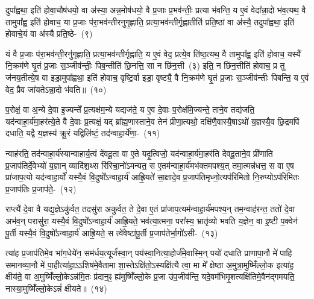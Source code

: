 दुपा᳚ह्वथा॒ इति॑ होवा॒चौष॑धयो॒ वा अ॑स्या॒ अन्न॒मोष॑धयो॒ वै प्र॒जाः प्र॒भव॑न्तीः॒ प्रत्या भ॑वन्ति॒ य ए॒वं वेदा᳚न्ना॒दो भ॑व॒त्यथ॒ वै तामुपा᳚ह्व॒ इति॑ होवाच॒ या प्र॒जाः प॑रा॒भव॑न्तीरनुगृ॒ह्णाति॒ प्रत्या॒भव॑न्तीर्गृ॒ह्णातीति॑ प्रति॒ष्ठां वा अ॑स्यै॒ तदुपा᳚ह्वथा॒ इति॑ होवाचे॒यं वा अ॑स्यै प्रति॒ष्ठे-~(९)

यं वै प्र॒जाः प॑रा॒भव॑न्ती॒रनु॑गृह्णाति॒ प्रत्या॒भव॑न्तीर्गृह्णाति॒ य ए॒वं वेद॒ प्रत्ये॒व ति॑ष्ठ॒त्यथ॒ वै तामुपा᳚ह्व॒ इति॑ होवाच॒ यस्यै॑ नि॒क्रम॑णे घृ॒तं प्र॒जाः स॒ञ्जीव॑न्तीः॒ पिब॒न्तीति॑ छि॒नत्ति॒ सा न छि॑न॒त्ती~(३) इति॒ न छि॑न॒त्तीति॑ होवाच॒ प्र तु ज॑नय॒तीत्ये॒ष वा इडा॒मुपा᳚ह्वथा॒ इति॑ होवाच॒ वृष्टि॒र्वा इडा॒ वृष्ट्यै॒ वै नि॒क्रम॑णे घृ॒तं प्र॒जाः स॒ञ्जीव॑न्तीः पिबन्ति॒ य ए॒वं वेद॒ प्रैव जा॑यते\-ऽन्ना॒दो भ॑वति॥~(१०)

{\anuvakamend[{गौर्वा अ॑स्यै॒ तत् प्र॑ति॒ष्ठा\-ऽह्व॑था॒ इति॑ विꣳश॒तिश्च॑}]}%

प॒रोक्षं॒ वा अ॒न्ये दे॒वा इ॒ज्यन्ते᳚ प्र॒त्यक्ष॑म॒न्ये यद्यज॑ते॒ य ए॒व दे॒वाः प॒रोक्ष॑मि॒ज्यन्ते॒ ताने॒व तद्य॑जति॒ यद॑न्वाहा॒र्य॑मा॒हर॑त्ये॒ते वै दे॒वाः प्र॒त्यक्षं॒ यद् ब्रा᳚ह्म॒णास्ताने॒व तेन॑ प्रीणा॒त्यथो॒ दक्षि॑णै॒वास्यै॒षा\-ऽथो॑ य॒ज्ञस्यै॒व छि॒द्रमपि॑ दधाति॒ यद्वै य॒ज्ञस्य॑ क्रू॒रं यद्विलि॑ष्टं॒ तद॑न्वाहा॒र्ये॑णा॒-~(११)

न्वाह॑रति॒ तद॑न्वाहा॒र्य॑स्यान्वाहार्य॒त्वं दे॑वदू॒ता वा ए॒ते यदृ॒त्विजो॒ यद॑न्वाहा॒र्य॑मा॒हर॑ति देवदू॒ताने॒व प्री॑णाति प्र॒जा\-प॑तिर्दे॒वेभ्यो॑ य॒ज्ञान् व्यादि॑श॒थ्स रि॑रिचा॒नो॑\-ऽमन्यत॒ स ए॒तम॑न्वाहा॒र्य॑मभ॑क्तमपश्य॒त् तमा॒त्मन्न॑धत्त॒ स वा ए॒ष प्रा॑जाप॒त्यो यद॑न्वाहा॒र्यो॑ यस्यै॒वं वि॒दुषो᳚\-ऽन्वाहा॒र्य॑ आह्रि॒यते॑ सा॒क्षादे॒व प्र॒जा\-प॑तिमृध्नो॒त्यप॑रिमितो नि॒रुप्यो\-ऽप॑रिमितः प्र॒जा\-प॑तिः प्र॒जा\-प॑ते॒-~(१२)

राप्त्यै॑ दे॒वा वै यद्य॒ज्ञे\-ऽकु॑र्वत॒ तदसु॑रा अकुर्वत॒ ते दे॒वा ए॒तं प्रा॑जाप॒त्यम॑न्वाहा॒र्य॑मपश्य॒न् तम॒न्वाह॑रन्त॒ ततो॑ दे॒वा अभ॑व॒न् परासु॑रा॒ यस्यै॒वं वि॒दुषो᳚\-ऽन्वाहा॒र्य॑ आह्रि॒यते॒ भव॑त्या॒त्मना॒ परा᳚स्य॒ भ्रातृ॑व्यो भवति य॒ज्ञेन॒ वा इ॒ष्टी प॒क्वेन॑ पू॒र्ती यस्यै॒वं वि॒दुषो᳚\-ऽन्वाहा॒र्य॑ आह्रि॒यते॒ स त्वे॑वेष्टा॑पू॒र्ती प्र॒जा\-प॑तेर्भा॒गो॑\-\mbox{\-ऽसी-~(१३)}

त्या॑ह प्र॒जा\-प॑तिमे॒व भा॑ग॒धेये॑न॒ सम॑र्धय॒त्यूर्ज॑स्वा॒न् पय॑स्वा॒नित्या॒होर्ज॑मे॒वास्मि॒न् पयो॑ दधाति प्राणापा॒नौ मे॑ पाहि समानव्या॒नौ मे॑ पा॒हीत्या॑हा॒\-ऽऽ\-शिष॑मे॒वैतामा शा॒स्ते\-ऽक्षि॑तो॒\-ऽस्यक्षि॑त्यै त्वा॒ मा मे᳚ क्षेष्ठा अ॒मुत्रा॒मुष्मिँ॑ल्लो॒क इत्या॑ह॒ क्षीय॑ते॒ वा अ॒मुष्मिँ॑ल्लो॒के\-ऽन्न॑मि॒तः प्र॑दान॒ꣴ॒ ह्य॑मुष्मिँ॑ल्लो॒के प्र॒जा उ॑प॒जीव॑न्ति॒ यदे॒वम॑भिमृ॒शत्यक्षि॑तिमे॒वैन॑द्गमयति॒ नास्या॒मुष्मिँ॑ल्लो॒के\-ऽन्नं॑ क्षीयते॥~(१४)

